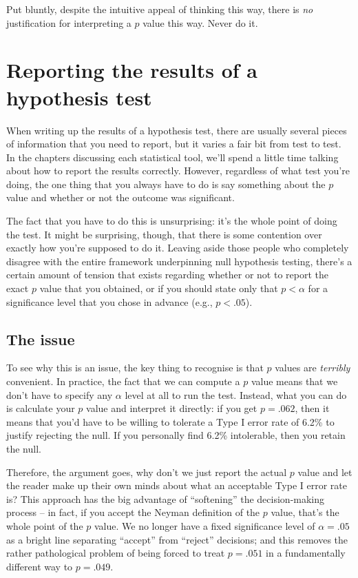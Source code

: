 \documentclass[
  11pt,
  a4paper,
  twoside,symmetric,openright]{book}
\theoremstyle{break}
\theoremstyle{break}
\begin{document}
Put bluntly, despite the intuitive appeal of thinking this way, there is \emph{no} justification for interpreting a \(p\) value this way. Never do it.

\section{Reporting the results of a hypothesis test}\label{writeup}

When writing up the results of a hypothesis test, there are usually several pieces of information that you need to report, but it varies a fair bit from test to test. In the chapters discussing each statistical tool, we'll spend a little time talking about how to report the results correctly. However, regardless of what test you're doing, the one thing that you always have to do is say something about the \(p\) value and whether or not the outcome was significant.

The fact that you have to do this is unsurprising: it's the whole point of doing the test. It might be surprising, though, that there is some contention over exactly how you're supposed to do it. Leaving aside those people who completely disagree with the entire framework underpinning null hypothesis testing, there's a certain amount of tension that exists regarding whether or not to report the exact \(p\) value that you obtained, or if you should state only that \(p < \alpha\) for a significance level that you chose in advance (e.g., \(p<.05\)).

\subsection{The issue}\label{the-issue}

To see why this is an issue, the key thing to recognise is that \(p\) values are \emph{terribly} convenient. In practice, the fact that we can compute a \(p\) value means that we don't have to specify any \(\alpha\) level at all to run the test. Instead, what you can do is calculate your \(p\) value and interpret it directly: if you get \(p = .062\), then it means that you'd have to be willing to tolerate a Type I error rate of 6.2\% to justify rejecting the null. If you personally find 6.2\% intolerable, then you retain the null.

Therefore, the argument goes, why don't we just report the actual \(p\) value and let the reader make up their own minds about what an acceptable Type I error rate is? This approach has the big advantage of ``softening'' the decision-making process -- in fact, if you accept the Neyman definition of the \(p\) value, that's the whole point of the \(p\) value. We no longer have a fixed significance level of \(\alpha = .05\) as a bright line separating ``accept'' from ``reject'' decisions; and this removes the rather pathological problem of being forced to treat \(p = .051\) in a fundamentally different way to \(p = .049\).
\end{document}
